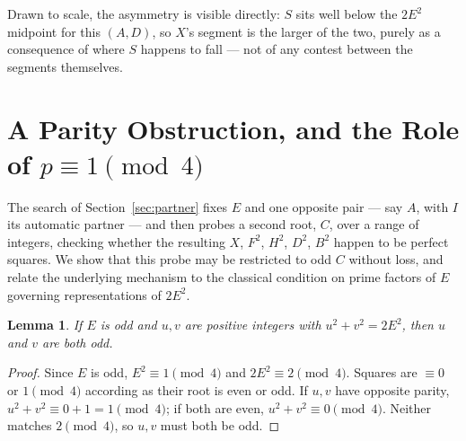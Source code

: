 \documentclass[12pt]{article}
\newtheorem{lemma}[theorem]{Lemma}
\theoremstyle{remark}
\begin{document}
\begin{center}
\end{center}

Drawn to scale, the asymmetry is visible directly: $S$ sits well below
the $2E^2$ midpoint for this $(A,D)$, so $X$'s segment is the larger of
the two, purely as a consequence of where $S$ happens to fall --- not
of any contest between the segments themselves.

\section{A Parity Obstruction, and the Role of $p \equiv 1 \pmod 4$}\label{sec:parity}

The search of Section~\ref{sec:partner} fixes $E$ and one opposite pair
--- say $A$, with $I$ its automatic partner --- and then probes a
second root, $C$, over a range of integers, checking whether the
resulting $X$, $F^2$, $H^2$, $D^2$, $B^2$ happen to be perfect squares.
We show that this probe may be restricted to odd $C$ without loss, and
relate the underlying mechanism to the classical condition on prime
factors of $E$ governing representations of $2E^2$.

\begin{lemma}\label{lem:oddpair}
If $E$ is odd and $u,v$ are positive integers with $u^2+v^2=2E^2$, then
$u$ and $v$ are both odd.
\end{lemma}

\begin{proof}
Since $E$ is odd, $E^2 \equiv 1 \pmod4$ and $2E^2 \equiv 2 \pmod4$.
Squares are $\equiv 0$ or $1 \pmod4$ according as their root is even or
odd. If $u,v$ have opposite parity, $u^2+v^2 \equiv 0+1 = 1 \pmod4$; if
both are even, $u^2+v^2 \equiv 0 \pmod4$. Neither matches $2 \pmod4$, so
$u,v$ must both be odd.
\end{proof}
\end{document}
